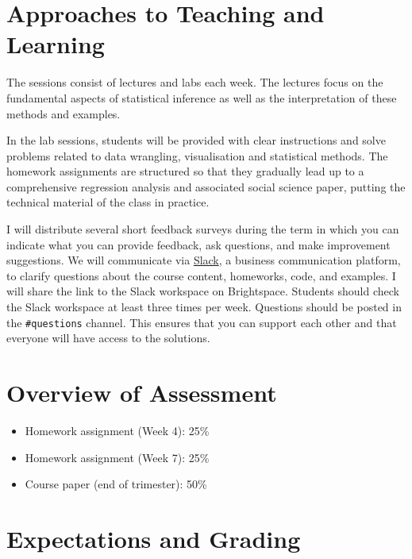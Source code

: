 \documentclass[abstract=on,parskip=full,headings=standardclasses,fontsize=11pt,paper=a4]{scrartcl}
\begin{document}
\section*{Approaches to Teaching and Learning}

The sessions consist of lectures and labs each week. %
The lectures focus on the fundamental aspects of statistical inference as well as the interpretation of these methods and examples. %

In the  lab sessions, students will be provided with clear instructions and solve problems related to data wrangling, visualisation and statistical methods. The homework assignments are structured so that they gradually lead up to a comprehensive regression analysis and associated social science paper, putting the technical material of the class in practice.


I will distribute several short feedback surveys during the term in which you can indicate what you can provide feedback, ask questions, and make improvement suggestions. We will communicate via \href{https://slack.com/intl/en-ie/}{Slack}, a business communication platform, to clarify questions about the course content, homeworks, code, and examples. I will share the link to the Slack workspace on Brightspace. Students should check the Slack workspace at least three times per week. Questions should be posted in the \texttt{\#questions} channel. This ensures that you can support each other and that everyone will have access to the solutions.

\section*{Overview of Assessment}

\begin{itemize}
\item Homework assignment (Week 4): 25\% 
\item Homework assignment  (Week 7): 25\% 
\item Course paper (end of trimester): 50\%
\end{itemize}


\section*{Expectations and Grading}
\end{document}
